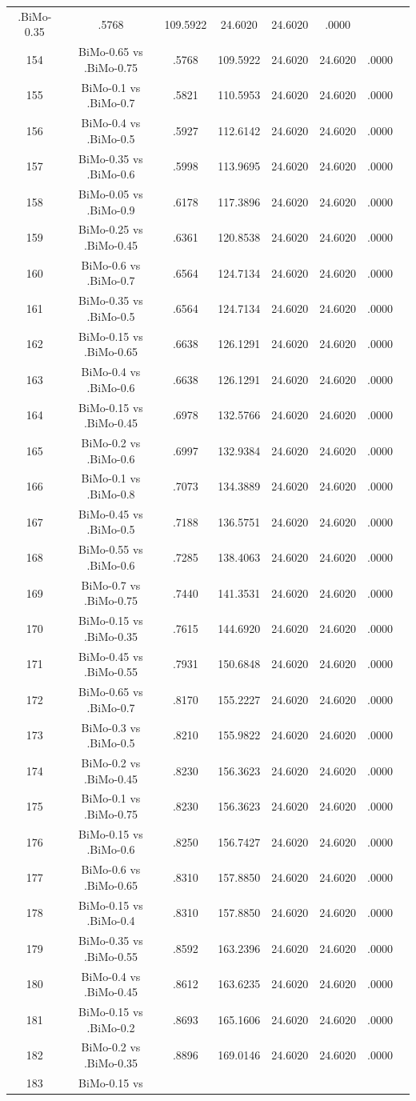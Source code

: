 \documentclass[a4paper,10pt]{article}
\begin{document}
\begin{landscape}
\begin{table}[!htp]
\begin{tabular}{cccccccc}
.BiMo-0.35&.5768&109.5922&24.6020&24.6020&.0000\\154&BiMo-0.65 vs .BiMo-0.75&.5768&109.5922&24.6020&24.6020&.0000\\155&BiMo-0.1 vs .BiMo-0.7&.5821&110.5953&24.6020&24.6020&.0000\\156&BiMo-0.4 vs .BiMo-0.5&.5927&112.6142&24.6020&24.6020&.0000\\157&BiMo-0.35 vs .BiMo-0.6&.5998&113.9695&24.6020&24.6020&.0000\\158&BiMo-0.05 vs .BiMo-0.9&.6178&117.3896&24.6020&24.6020&.0000\\159&BiMo-0.25 vs .BiMo-0.45&.6361&120.8538&24.6020&24.6020&.0000\\160&BiMo-0.6 vs .BiMo-0.7&.6564&124.7134&24.6020&24.6020&.0000\\161&BiMo-0.35 vs .BiMo-0.5&.6564&124.7134&24.6020&24.6020&.0000\\162&BiMo-0.15 vs .BiMo-0.65&.6638&126.1291&24.6020&24.6020&.0000\\163&BiMo-0.4 vs .BiMo-0.6&.6638&126.1291&24.6020&24.6020&.0000\\164&BiMo-0.15 vs .BiMo-0.45&.6978&132.5766&24.6020&24.6020&.0000\\165&BiMo-0.2 vs .BiMo-0.6&.6997&132.9384&24.6020&24.6020&.0000\\166&BiMo-0.1 vs .BiMo-0.8&.7073&134.3889&24.6020&24.6020&.0000\\167&BiMo-0.45 vs .BiMo-0.5&.7188&136.5751&24.6020&24.6020&.0000\\168&BiMo-0.55 vs .BiMo-0.6&.7285&138.4063&24.6020&24.6020&.0000\\169&BiMo-0.7 vs .BiMo-0.75&.7440&141.3531&24.6020&24.6020&.0000\\170&BiMo-0.15 vs .BiMo-0.35&.7615&144.6920&24.6020&24.6020&.0000\\171&BiMo-0.45 vs .BiMo-0.55&.7931&150.6848&24.6020&24.6020&.0000\\172&BiMo-0.65 vs .BiMo-0.7&.8170&155.2227&24.6020&24.6020&.0000\\173&BiMo-0.3 vs .BiMo-0.5&.8210&155.9822&24.6020&24.6020&.0000\\174&BiMo-0.2 vs .BiMo-0.45&.8230&156.3623&24.6020&24.6020&.0000\\175&BiMo-0.1 vs .BiMo-0.75&.8230&156.3623&24.6020&24.6020&.0000\\176&BiMo-0.15 vs .BiMo-0.6&.8250&156.7427&24.6020&24.6020&.0000\\177&BiMo-0.6 vs .BiMo-0.65&.8310&157.8850&24.6020&24.6020&.0000\\178&BiMo-0.15 vs .BiMo-0.4&.8310&157.8850&24.6020&24.6020&.0000\\179&BiMo-0.35 vs .BiMo-0.55&.8592&163.2396&24.6020&24.6020&.0000\\180&BiMo-0.4 vs .BiMo-0.45&.8612&163.6235&24.6020&24.6020&.0000\\181&BiMo-0.15 vs .BiMo-0.2&.8693&165.1606&24.6020&24.6020&.0000\\182&BiMo-0.2 vs .BiMo-0.35&.8896&169.0146&24.6020&24.6020&.0000\\183&BiMo-0.15 vs 
\end{tabular}
\end{table}
\end{landscape}
\end{document}
